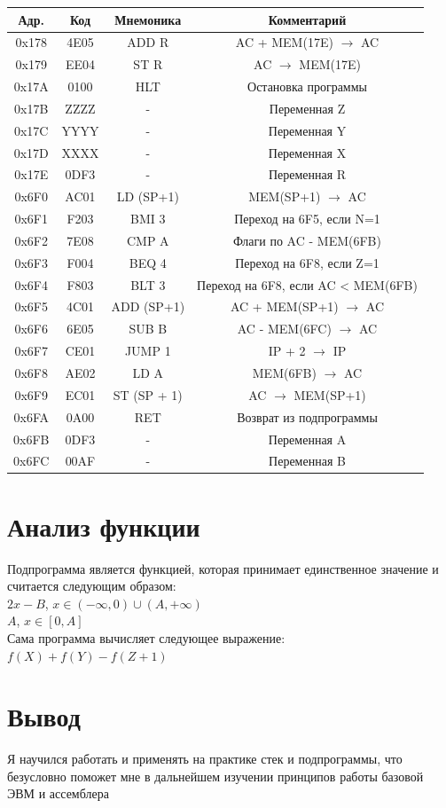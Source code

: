 \documentclass[12pt,a4paper]{report}
\begin{document}
\begin{longtable}{|c|c|c|c|}
        \hline
        Адр. & Код & Мнемоника & Комментарий \\
        \hline
        0x178 & 4E05 & ADD R & AC + MEM(17E) $\rightarrow$ AC \\
        \hline
        0x179 & EE04 & ST R & AC $\rightarrow$ MEM(17E) \\
        \hline
        0x17A & 0100 & HLT & Остановка программы \\
        \hline
        0x17B & ZZZZ & - & Переменная Z \\
        \hline
        0x17C & YYYY & - & Переменная Y \\
        \hline
        0x17D & XXXX & - & Переменная X \\
        \hline
        0x17E & 0DF3 & - & Переменная R \\
        \hline
        \hline
        0x6F0 & AC01 & LD (SP+1) & MEM(SP+1) $\rightarrow$ AC \\
        \hline
        0x6F1 & F203 & BMI 3 & Переход на 6F5, если N=1 \\
        \hline
        0x6F2 & 7E08 & CMP A & Флаги по AC - MEM(6FB) \\
        \hline
        0x6F3 & F004 & BEQ 4 & Переход на 6F8, если Z=1 \\
        \hline
        0x6F4 & F803 & BLT 3 & Переход на 6F8, если AC < MEM(6FB) \\
        \hline
        0x6F5 & 4C01 & ADD (SP+1) & AC + MEM(SP+1) $\rightarrow$ AC \\
        \hline
        0x6F6 & 6E05 & SUB B & AC - MEM(6FC) $\rightarrow$ AC \\
        \hline
        0x6F7 & CE01 & JUMP 1 & IP + 2 $\rightarrow$ IP \\
        \hline
        0x6F8 & AE02 & LD A & MEM(6FB) $\rightarrow$ AC \\
        \hline
        0x6F9 & EC01 & ST (SP + 1) & AC $\rightarrow$ MEM(SP+1) \\
        \hline
        0x6FA & 0A00 & RET & Возврат из подпрограммы \\
        \hline
        0x6FB & 0DF3 & - & Переменная A \\
        \hline
        0x6FC & 00AF & - & Переменная B \\
        \hline
    \end{longtable}
    \section*{Анализ функции}
    Подпрограмма является функцией, которая принимает единственное значение и 
    считается следующим образом:\\
    \hfill\break
    $ 2x-B$, $x\in(-\infty,0)\cup(A, +\infty) $\\
    $ A $, $x\in [0, A]$\\
    \hfill\break
    Сама программа вычисляет следующее выражение:\\
    \hfill\break
    $f(X)+f(Y)-f(Z+1)$
    \section*{Вывод}
    Я научился работать и применять на практике стек и подпрограммы, что безусловно поможет мне в дальнейшем изучении принципов работы базовой ЭВМ и ассемблера
\end{document}
